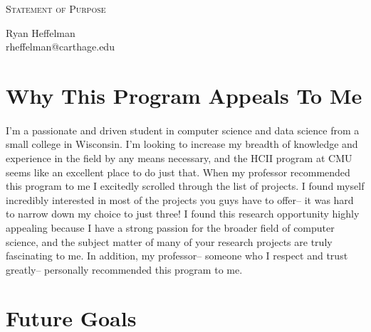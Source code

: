 \documentclass[12pt]{article}
\makeatletter
\newcommand{\soptitle}{Statement of Purpose}
\newcommand{\yourname}{Ryan Heffelman}
\newcommand{\youremail}{rheffelman@carthage.edu}
\makeatother
\begin{document}
\begin{center}{\huge \scshape \soptitle}\end{center}
\begin{center}\vspace{0.2em} {\Large \yourname\\}
  {\youremail}\end{center}

\section*{Why This Program Appeals To Me}

\paragraph{}

I’m a passionate and driven student in computer science and data science from a small college in Wisconsin. I’m looking to increase my breadth of knowledge and experience in the field by any means necessary, and the HCII program at CMU seems like an excellent place to do just that. When my professor recommended this program to me I excitedly scrolled through the list of projects. I found myself incredibly interested in most of the projects you guys have to offer– it was hard to narrow down my choice to just three! I found this research opportunity highly appealing because I have a strong passion for the broader field of computer science, and the subject matter of many of your research projects are truly fascinating to me. In addition, my professor– someone who I respect and trust greatly– personally recommended this program to me.

\section*{Future Goals}

\paragraph{}
\end{document}
